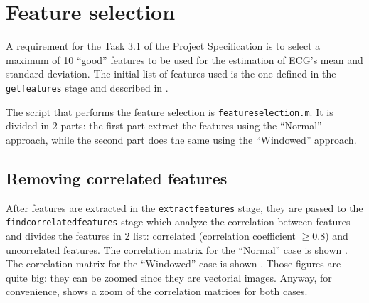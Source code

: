 \section{Feature selection}\label{sec:featureselection}

A requirement for the Task 3.1 of the Project Specification is to select a
maximum of 10 ``good'' features to be used for the estimation of ECG's mean and
standard deviation. The initial list of features used is the one defined in the
\texttt{getfeatures} stage and described in .

The script that performs the feature selection is \texttt{featureselection.m}.
It is divided in 2 parts: the first part extract the features using the
``Normal'' approach, while the second part does the same using the ``Windowed''
approach.

\subsection{Removing correlated features}\label{subsec:dropcorrelatedfeatures}

After features are extracted in the \texttt{extractfeatures} stage, they are
passed to the \texttt{findcorrelatedfeatures} stage which analyze the
correlation between features and divides the features in 2 list: correlated
(correlation coefficient \(\ge 0.8\)) and uncorrelated features. The
correlation matrix for the ``Normal'' case is shown
. The correlation matrix for the ``Windowed'' case
is shown . Those figures are quite big:
they can be zoomed since they are vectorial images. Anyway, for convenience,
 shows a zoom of the correlation matrices for both
cases.

